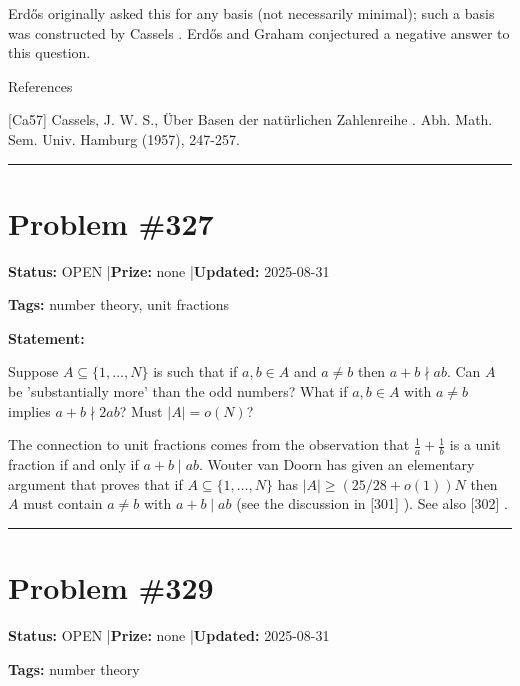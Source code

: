 \documentclass{article}
\begin{document}
Erd\H{o}s originally asked this for any basis (not necessarily minimal); such a basis was constructed by Cassels \cite{Ca57}. Erd\H{o}s and Graham conjectured a negative answer to this question.




References

[Ca57] Cassels, J. W. S., \"{U}ber Basen der nat\"{u}rlichen Zahlenreihe . Abh. Math. Sem. Univ. Hamburg (1957), 247-257.

\noindent\rule{\linewidth}{0.4pt}


\section{Problem \#327}
\label{prob:327}

\noindent\textbf{Status:} OPEN \quad|\quad \textbf{Prize:} none \quad|\quad \textbf{Updated:} 2025-08-31

\noindent\textbf{Tags:} number theory, unit fractions

\medskip

\noindent\textbf{Statement:}

Suppose $A\subseteq \{1,\ldots,N\}$ is such that if $a,b\in A$ and $a\neq b$ then $a+b\nmid ab$. Can $A$ be 'substantially more' than the odd numbers? What if $a,b\in A$ with $a\neq b$ implies $a+b\nmid 2ab$? Must $\lvert A\rvert=o(N)$?




The connection to unit fractions comes from the observation that $\frac{1}{a}+\frac{1}{b}$ is a unit fraction if and only if $a+b\mid ab$. Wouter van Doorn has given an elementary argument that proves that if $A\subseteq \{1,\ldots,N\}$ has $\lvert A\rvert \geq (25/28+o(1))N$ then $A$ must contain $a\neq b$ with $a+b\mid ab$ (see the discussion in [301] ). See also [302] .

\noindent\rule{\linewidth}{0.4pt}


\section{Problem \#329}
\label{prob:329}

\noindent\textbf{Status:} OPEN \quad|\quad \textbf{Prize:} none \quad|\quad \textbf{Updated:} 2025-08-31

\noindent\textbf{Tags:} number theory

\medskip
\end{document}
